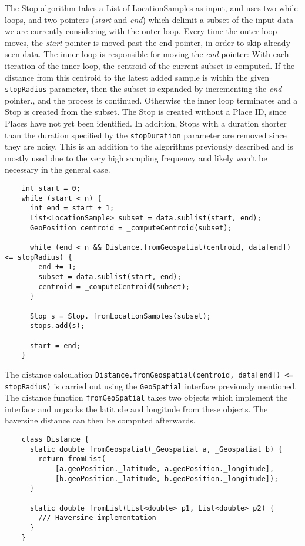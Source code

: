 The Stop algorithm takes a List of LocationSamples as input, and uses two while-loops, and two pointers (\textit{start} and \textit{end}) which delimit a subset of the input data we are currently considering with the outer loop. Every time the outer loop moves, the \textit{start} pointer is moved past the end pointer, in order to skip already seen data. The inner loop is responsible for moving the \textit{end} pointer: With each iteration of the inner loop, the centroid of the current subset is computed. If the distance from this centroid to the latest added sample is within the given \verb|stopRadius| parameter, then the subset is expanded by incrementing the \textit{end} pointer., and the process is continued. Otherwise the inner loop terminates and a Stop is created from the subset. The Stop is created without a Place ID, since Places have not yet been identified. In addition, Stops with a duration shorter than the duration specified by the \verb|stopDuration| parameter are removed since they are noisy. This is an addition to the algorithms previously described and is mostly used due to the very high sampling frequency and likely won't be necessary in the general case.

\begin{verbatim}
    int start = 0;
    while (start < n) {
      int end = start + 1;
      List<LocationSample> subset = data.sublist(start, end);
      GeoPosition centroid = _computeCentroid(subset);
        
      while (end < n && Distance.fromGeospatial(centroid, data[end]) <= stopRadius) {
        end += 1;
        subset = data.sublist(start, end);
        centroid = _computeCentroid(subset);
      }
    
      Stop s = Stop._fromLocationSamples(subset);
      stops.add(s);
    
      start = end;
    }
\end{verbatim}

The distance calculation \verb|Distance.fromGeospatial(centroid, data[end]) <= stopRadius)| is carried out using the \verb|GeoSpatial| interface previously mentioned. The distance function \verb|fromGeoSpatial| takes two objects which implement the interface and unpacks the latitude and longitude from these objects. The haversine distance can then be computed afterwards.

\begin{verbatim}
    class Distance {
      static double fromGeospatial(_Geospatial a, _Geospatial b) {
        return fromList(
            [a.geoPosition._latitude, a.geoPosition._longitude],
            [b.geoPosition._latitude, b.geoPosition._longitude]);
      }
    
      static double fromList(List<double> p1, List<double> p2) {
        /// Haversine implementation
      }
    }
\end{verbatim}

